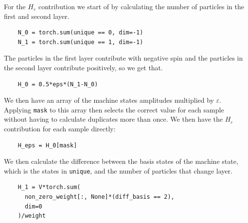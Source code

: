 For the $H_{\varepsilon}$ contribution we start of by calculating the number of particles in the first and second layer.

\begin{verbatim}
    N_0 = torch.sum(unique == 0, dim=-1)
    N_1 = torch.sum(unique == 1, dim=-1)
\end{verbatim}

The particles in the first layer contribute with negative spin and the particles in the second layer contribute positively, so we get that.

\begin{verbatim} 
    H_0 = 0.5*eps*(N_1-N_0)
\end{verbatim}

We then have an array of the machine states amplitudes multiplied by $\varepsilon$. Applying \texttt{mask} to this array then selects the correct value for each sample without having to calculate duplicates more than once. We then have the $H_{\varepsilon}$ contribution for each sample directly:

\begin{verbatim} 
    H_eps = H_0[mask]
\end{verbatim}

We then calculate the difference between the basis states of the machine state, which is the states in \texttt{unique}, and the number of particles that change layer.

\begin{verbatim}
    H_1 = V*torch.sum(
      non_zero_weight[:, None]*(diff_basis == 2), 
      dim=0
    )/weight
\end{verbatim}


